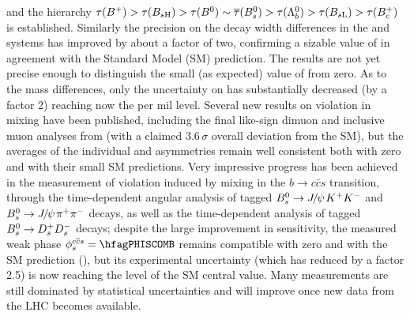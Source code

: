 and the hierarchy
$\tau(\Bu)> \tau(B_{s\rm H})> \tau(\Bd) \sim \bar{\tau}(\Bs) > \tau(\Lb) > \tau(B_{s\rm L}) > \tau(\Bc)$
is established. 
Similarly the precision on the decay width differences in the \Bd and \Bs systems has improved by about a factor of two, confirming a sizable value of \DGs in agreement with the Standard Model (SM) prediction.
The results are not yet precise enough to distinguish the small (as expected) value of \DGd from zero.
As to the mass differences, only the uncertainty on \dms has substantially decreased (by a factor 2) 
reaching now the per mil level. Several new results on \CP violation in mixing have been 
published, including the final like-sign dimuon and inclusive muon analyses from \dzero (with a claimed 
$3.6\,\sigma$ overall deviation from the SM), but the averages of the individual \Bd and \Bs asymmetries 
remain well consistent both with zero and with their small SM predictions. 
Very impressive progress has been achieved in the measurement of
\CP violation induced by \Bs mixing in the $b\to c\bar{c}s$ transition, through the 
time-dependent angular analysis of tagged $B^0_s\to {J\mskip -3mu/\mskip -2mu\psi\mskip 2mu} K^+K^-$ and $B^0_s\to {J\mskip -3mu/\mskip -2mu\psi\mskip 2mu} \pi^+\pi^-$ decays,
as well as the time-dependent analysis of tagged  $B^0_s\to D_s^+ D_s^-$ decays; 
despite the large improvement in sensitivity, the measured weak phase
$\phiccbars = \hfagPHISCOMB$ remains compatible with zero and with the SM prediction (\hfagPHISSM), 
but its experimental uncertainty (which has reduced by a factor 2.5) is now reaching the level of the SM central value.
Many measurements are still dominated by statistical uncertainties and will improve once new data from the LHC becomes available.


